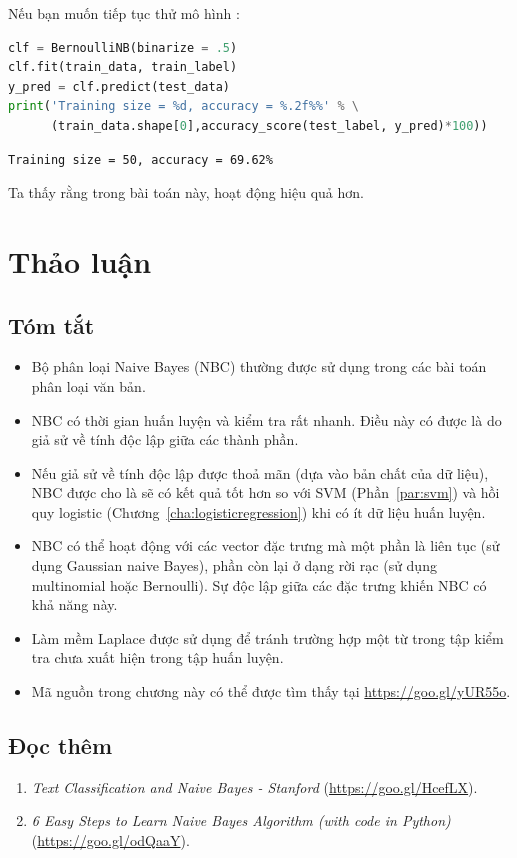 Nếu bạn muốn tiếp tục thử mô hình :


\begin{lstlisting}[language=Python]
clf = BernoulliNB(binarize = .5)
clf.fit(train_data, train_label)
y_pred = clf.predict(test_data)
print('Training size = %d, accuracy = %.2f%%' % \
      (train_data.shape[0],accuracy_score(test_label, y_pred)*100))
\end{lstlisting}
\kq
\begin{lstlisting}
Training size = 50, accuracy = 69.62%
\end{lstlisting}


Ta thấy rằng trong bài toán này,  hoạt động hiệu quả hơn.

\section{Thảo luận}
\subsection{Tóm tắt}
\begin{itemize}
\item Bộ phân loại Naive Bayes (NBC) thường được sử dụng trong các bài toán phân loại văn bản.

\item NBC có thời gian huấn luyện và kiểm tra rất nhanh. Điều này có được là do giả sử về tính độc lập giữa các thành phần.

\item Nếu giả sử về tính độc lập được thoả mãn (dựa vào bản chất của dữ liệu),
NBC được cho là sẽ có kết quả tốt hơn so với SVM
(Phần~\ref{par:svm}) và hồi quy logistic (Chương~\ref{cha:logisticregression})
khi có ít dữ liệu huấn luyện.

\item NBC có thể hoạt động với các vector đặc trưng mà một phần là liên tục (sử
dụng Gaussian naive Bayes), phần còn lại ở dạng rời rạc (sử dụng multinomial
hoặc Bernoulli). Sự độc lập giữa các đặc trưng khiến NBC có khả năng này.

\item Làm mềm Laplace được sử dụng
để tránh trường hợp một từ trong tập kiểm tra chưa xuất hiện trong tập huấn luyện.

\item Mã nguồn trong chương này có thể được tìm thấy tại \url{https://goo.gl/yUR55o}.


\end{itemize}

\subsection{Đọc thêm}

\begin{enumerate}
\item \textit{Text Classification and Naive Bayes - Stanford} (\url{https://goo.gl/HcefLX}).

\item \textit{6 Easy Steps to Learn Naive Bayes Algorithm (with code in Python)} (\url{https://goo.gl/odQaaY}).
\end{enumerate}


